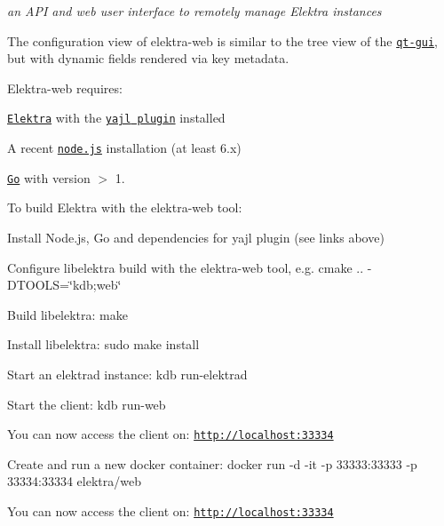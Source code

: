 {\itshape an A\+PI and web user interface to remotely manage Elektra instances}

The configuration view of elektra-\/web is similar to the tree view of the \href{https://master.libelektra.org/src/tools/qt-gui}{\tt qt-\/gui}, but with dynamic fields rendered via key metadata.

Elektra-\/web requires\+:


\begin{DoxyItemize}
\item \href{https://libelektra.org/}{\tt Elektra} with the \href{https://master.libelektra.org/src/plugins/yajl/}{\tt {\ttfamily yajl} plugin} installed
\item A recent \href{https://nodejs.org/en/}{\tt node.\+js} installation (at least 6.\+x)
\item \href{https://golang.org/}{\tt Go} with version $>$ 1.
\end{DoxyItemize}

To build Elektra with the elektra-\/web tool\+:


\begin{DoxyItemize}
\item Install Node.\+js, Go and dependencies for {\ttfamily yajl} plugin (see links above)
\item Configure libelektra build with the elektra-\/web tool, e.\+g. {\ttfamily cmake .. -\/\+D\+T\+O\+O\+LS=\char`\"{}kdb;web\char`\"{}}
\item Build libelektra\+: {\ttfamily make}
\item Install libelektra\+: {\ttfamily sudo make install}
\end{DoxyItemize}


\begin{DoxyItemize}
\item Start an elektrad instance\+: {\ttfamily kdb run-\/elektrad}
\item Start the client\+: {\ttfamily kdb run-\/web}
\item You can now access the client on\+: \href{http://localhost:33334}{\tt http\+://localhost\+:33334}
\end{DoxyItemize}


\begin{DoxyItemize}
\item Create and run a new docker container\+: {\ttfamily docker run -\/d -\/it -\/p 33333\+:33333 -\/p 33334\+:33334 elektra/web}
\item You can now access the client on\+: \href{http://localhost:33334}{\tt http\+://localhost\+:33334}
\end{DoxyItemize}


